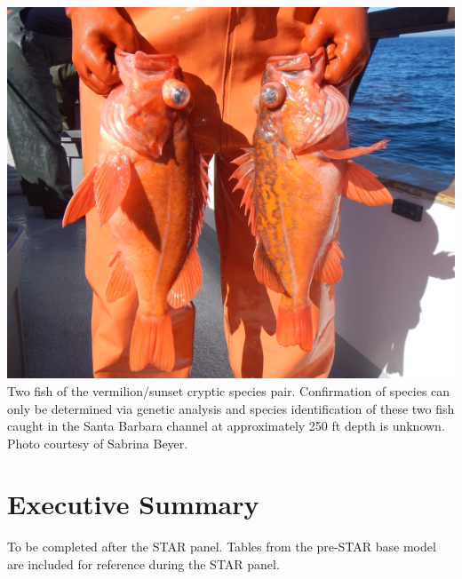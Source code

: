 \documentclass[11pt,
  english,
  a4paper,
]{article}
\begin{document}
\newcommand{\lt}{\ensuremath <}
\newcommand{\gt}{\ensuremath >}

\newcommand\CapeM{$40^\circ 10^\prime N$}
\newcommand\PtC{$34^\circ 27^\prime N$}
\newcommand\CAOR{$42^\circ 00^\prime N$}

\newpage

\includegraphics{cover_photo.png} Two fish of the vermilion/sunset cryptic species pair. Confirmation of species can only be determined via genetic analysis and species identification of these two fish caught in the Santa Barbara channel at approximately 250 ft depth is unknown. Photo courtesy of Sabrina Beyer.

\pagebreak
{}
\setcounter{page}{1}

\renewcommand{\thetable}{\roman{table}}
\renewcommand{\thefigure}{\roman{figure}}

\setlength\parskip{0.5em plus 0.1em minus 0.2em}


\hypertarget{executive-summary}{%
\section*{Executive Summary}\label{executive-summary}}

\leavevmode\tagmcend\tagstructend

To be completed after the STAR panel. Tables from the pre-STAR base model are included for reference during the STAR panel.
\end{document}
